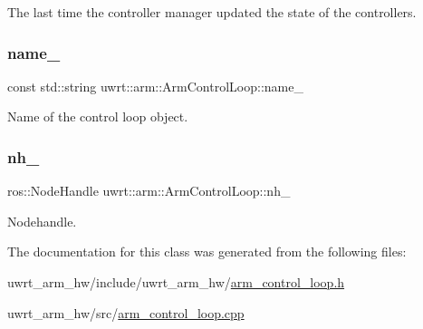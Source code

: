 The last time the controller manager updated the state of the controllers. 

\mbox{\label{classuwrt_1_1arm_1_1_arm_control_loop_a6082448e453dda1b08d3af23e156b889}} 
\subsubsection{\texorpdfstring{name\+\_\+}{name\_}}
{\footnotesize\ttfamily const std\+::string uwrt\+::arm\+::\+Arm\+Control\+Loop\+::name\+\_\+\hspace{0.3cm}{\ttfamily [protected]}}



Name of the control loop object. 

\mbox{\label{classuwrt_1_1arm_1_1_arm_control_loop_ac893531965c914e8ed54dfe97909be7d}} 
\subsubsection{\texorpdfstring{nh\+\_\+}{nh\_}}
{\footnotesize\ttfamily ros\+::\+Node\+Handle uwrt\+::arm\+::\+Arm\+Control\+Loop\+::nh\+\_\+\hspace{0.3cm}{\ttfamily [protected]}}



Nodehandle. 



The documentation for this class was generated from the following files\+:\begin{DoxyCompactItemize}
\item 
uwrt\+\_\+arm\+\_\+hw/include/uwrt\+\_\+arm\+\_\+hw/\hyperlink{arm__control__loop_8h}{arm\+\_\+control\+\_\+loop.\+h}\item 
uwrt\+\_\+arm\+\_\+hw/src/\hyperlink{arm__control__loop_8cpp}{arm\+\_\+control\+\_\+loop.\+cpp}\end{DoxyCompactItemize}
